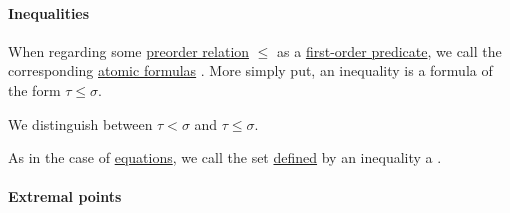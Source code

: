 \paragraph{Inequalities}

\begin{definition}\label{def:inequality}\mimprovised
  When regarding some \hyperref[def:preordered_set]{preorder relation} \( \leq \) as a \hyperref[def:first_order_language/pred]{first-order predicate}, we call the corresponding \hyperref[def:first_order_syntax/atomic_formula]{atomic formulas} . More simply put, an inequality is a formula of the form \( \tau \leq \sigma \).

  We distinguish between  \( \tau < \sigma \) and  \( \tau \leq \sigma \).

  As in the case of \hyperref[def:first_order_equation]{equations}, we call the set \hyperref[def:first_order_definability]{defined} by an inequality a .
\end{definition}

\paragraph{Extremal points}

